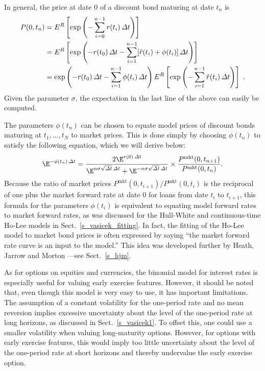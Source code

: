 In general, the price at date 0 of a discount bond maturing at date $t_n$ is
\begin{align}
P(0,t_n) &= E^R\left[\exp\left(-\sum_{i=0}^{n-1} r(t_i)\,\varDelta t\right)\right]\notag\\
&= E^R\left[\exp\left(-r(t_0)\,\varDelta t - \sum_{i=1}^{n-1} [\hat{r}(t_i) + \phi(t_i) ]\,\varDelta t\right)\right]\notag\\
&= \exp\left(-r(t_0)\,\varDelta t-\sum_{i=1}^{n-1}\phi(t_i)\,\varDelta t \right)E^R\left[\exp\left(-\sum_{i=1}^{n-1} \hat{r}(t_i) \,\varDelta t\right)\right]\;. \label{holee1}
\end{align}
Given the parameter $\sigma$, the expectation in the last line of the above can easily be computed.  

The parameters $\phi(t_n)$ can be chosen to equate model prices of  discount bonds maturing at $t_1, \ldots, t_N$ to market prices.  This is done simply by choosing $\phi(t_n)$ to satisfy the following equation, which we will derive below:
\begin{equation}\label{holee3}
\E^{-\phi(t_n)\,\varDelta t} = \frac{2\E^{r(0)\,\varDelta t}}{ \E^{n\sigma\sqrt{\varDelta t}\,\varDelta t} +  \E^{-n\sigma\sqrt{\varDelta t}\,\varDelta t}}\times \frac{P^{\text{mkt}}(0,t_{n+1})}{P^{\text{mkt}}(0,t_{n})}.
\end{equation}
Because the ratio of market prices $P^{\text{mkt}}(0,t_{i+1})/P^{\text{mkt}}(0,t_{i})$ is the reciprocal of one plus the market forward rate at date 0 for loans from date $t_i$ to $t_{i+1}$, this formula for the parameters $\phi(t_i)$ is equivalent to equating model forward rates to market forward rates, as was discussed for the Hull-White and continuous-time Ho-Lee models in Sect.~\ref{s_vasicek_fitting}.  In fact, the fitting of the Ho-Lee model to market bond prices is often expressed by saying ``the market forward rate curve is an input to the model.''  This idea was developed further by Heath, Jarrow and Morton \cite{HJM}---see Sect.~\ref{s_hjm}.  

As for options on equities and currencies, the binomial model for interest rates is especially useful for valuing early exercise features.  
However, it should be noted that, even though this model is very easy to use, it has important limitations.  The assumption of a constant volatility for the one-period rate and no mean reversion implies excessive uncertainty about the level of the one-period rate at long horizons, as discussed in Sect.~\ref{s_vasicek1}.  To offset this, one could use a smaller volatility when valuing long-maturity options.  However, for options with early exercise features, this would imply too little uncertainty about the level of the one-period rate at short horizons and thereby undervalue the early exercise option.


